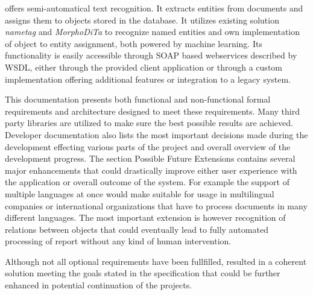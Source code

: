 
\textan{} offers semi-automatical text recognition. It extracts entities from
documents and assigns them to objects stored in the database. It utilizes existing
solution \emph{nametag} and \emph{MorphoDiTa} to recognize named entities and own
implementation of object to entity assignment, both powered by machine learning.
Its functionality is easily accessible through SOAP based webservices described by
WSDL, either through the provided client application or through a custom
implementation offering additional features or integration to a legacy system.

This documentation presents both functional and non-functional formal
requirements and architecture designed to meet these requirements. Many third
party libraries are utilized to make sure the best possible results are achieved.
Developer documentation also lists the most important decisions made during the
development effecting various parts of the project and overall overview of the
development progress. The section Possible Future Extensions contains several
major enhancements that could drastically improve either user experience with the
application or overall outcome of the system. For example the support of multiple
languages at once would make \textan{} suitable for usage in multilingual
companies or international organizations that have to process documents in many
different languages. The most important extension is however recognition of
relations between objects that could eventually lead to fully automated
processing of report without any kind of human intervention.

Although not all optional requirements have been fullfilled, \textan{}
resulted in a coherent solution meeting the goals stated in the specification
that could be further enhanced in potential continuation of the projects.

